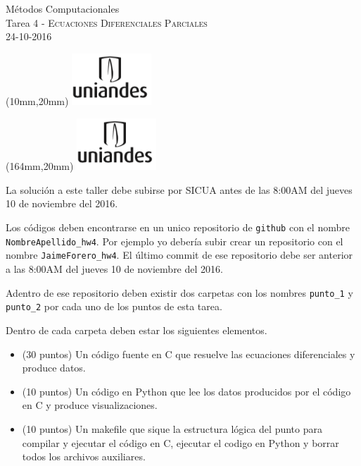 \documentclass[11pt,letterpaper]{exam}
\begin{document}
\begin{center}
{\Large M\'etodos Computacionales} \\
Tarea 4 - \textsc{Ecuaciones Diferenciales Parciales}\\
24-10-2016\\
\end{center}

\begin{textblock*}{40mm}(10mm,20mm)
  \includegraphics[width=3cm]{logoUniandes.png}
\end{textblock*}

\begin{textblock*}{40mm}(164mm,20mm)
  \includegraphics[width=3cm]{logoUniandes.png}
\end{textblock*}

\vspace{0.3cm}


\noindent
La solución a este taller debe subirse por SICUA antes de las 8:00AM
del jueves 10 de noviembre del 2016. 

\noindent
Los c\'odigos deben encontrarse en un unico repositorio de \verb'github'
con el nombre \verb"NombreApellido_hw4". Por ejemplo yo deber\'ia
subir crear un repositorio con el nombre
\verb"JaimeForero_hw4". El \'ultimo commit de ese repositorio debe ser
anterior a las 8:00AM del jueves 10 de noviembre del 2016.

\noindent
Adentro de ese repositorio deben existir dos
carpetas con los nombres \verb"punto_1" y \verb"punto_2" por cada uno
de los puntos de esta tarea. 

\noindent
Dentro de cada carpeta deben estar los siguientes elementos.
\begin{itemize}
\item (30 puntos) Un c\'odigo fuente en C que resuelve las ecuaciones
  diferenciales y produce datos.
\item (10 puntos) Un c\'odigo en Python que lee los datos producidos por el
  c\'odigo en C y produce visualizaciones.
\item (10 puntos) Un makefile que sique la estructura l\'ogica del punto para compilar y ejecutar el c\'odigo en C, ejecutar el
  codigo en Python y borrar todos los archivos auxiliares. 
\end{itemize}
\end{document}
